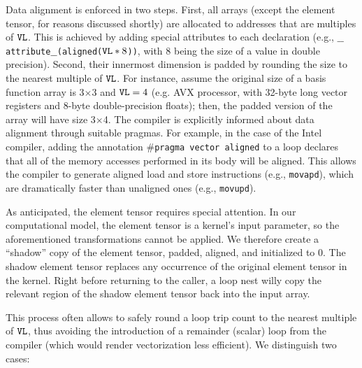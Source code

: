 Data alignment is enforced in two steps. First, all arrays (except the element tensor, for reasons discussed shortly) are allocated to addresses that are multiples of $\mbox{\texttt{VL}}$. This is achieved by adding special attributes to each declaration (e.g., {\tt $\_\_$attribute$\_\_$(aligned($\mbox{\texttt{VL}}*8$))}, with $8$ being the size of a value in double precision). Second, their innermost dimension is padded by rounding the size to the nearest multiple of $\mbox{\texttt{VL}}$. For instance, assume the original size of a basis function array is 3$\times$3 and $\mbox{\texttt{VL}}=4$ (e.g. AVX processor, with 32-byte long vector registers and 8-byte double-precision floats); then, the padded version of the array will have size 3$\times$4. The compiler is explicitly informed about data alignment through suitable pragmas. For example, in the case of the Intel compiler, adding the annotation \texttt{$\#$pragma vector aligned} to a loop declares that all of the memory accesses performed in its body will be aligned. This allows the compiler to generate aligned load and store instructions (e.g., {\tt movapd}), which are dramatically faster than unaligned ones (e.g., {\tt movupd}).

As anticipated, the element tensor requires special attention. In our computational model, the element tensor is a kernel's input parameter, so the aforementioned transformations cannot be applied. We therefore create a ``shadow'' copy of the element tensor, padded, aligned, and initialized to 0. The shadow element tensor replaces any occurrence of the original element tensor in the kernel. Right before returning to the caller, a loop nest willy copy the relevant region of the shadow element tensor back into the input array.

This process often allows to safely round a loop trip count to the nearest multiple of $\mbox{\texttt{VL}}$, thus avoiding the introduction of a remainder (scalar) loop from the compiler (which would render vectorization less efficient). We distinguish two cases:

